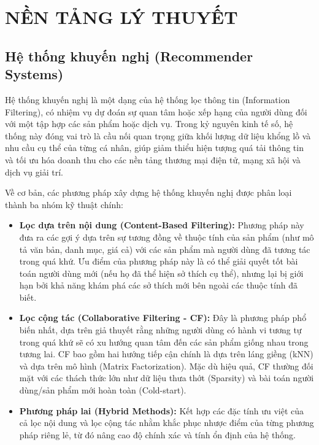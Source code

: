 \chapter{NỀN TẢNG LÝ THUYẾT}

\section{Hệ thống khuyến nghị (Recommender Systems)}

Hệ thống khuyến nghị là một dạng của hệ thống lọc thông tin (Information Filtering), có nhiệm vụ dự đoán sự quan tâm hoặc xếp hạng của người dùng đối với một tập hợp các sản phẩm hoặc dịch vụ. Trong kỷ nguyên kinh tế số, hệ thống này đóng vai trò là cầu nối quan trọng giữa khối lượng dữ liệu khổng lồ và nhu cầu cụ thể của từng cá nhân, giúp giảm thiểu hiện tượng quá tải thông tin và tối ưu hóa doanh thu cho các nền tảng thương mại điện tử, mạng xã hội và dịch vụ giải trí.

Về cơ bản, các phương pháp xây dựng hệ thống khuyến nghị được phân loại thành ba nhóm kỹ thuật chính:

\begin{itemize}
    \item \textbf{Lọc dựa trên nội dung (Content-Based Filtering):} Phương pháp này đưa ra các gợi ý dựa trên sự tương đồng về thuộc tính của sản phẩm (như mô tả văn bản, danh mục, giá cả) với các sản phẩm mà người dùng đã tương tác trong quá khứ. Ưu điểm của phương pháp này là có thể giải quyết tốt bài toán người dùng mới (nếu họ đã thể hiện sở thích cụ thể), nhưng lại bị giới hạn bởi khả năng khám phá các sở thích mới bên ngoài các thuộc tính đã biết.
    \item \textbf{Lọc cộng tác (Collaborative Filtering - CF):} Đây là phương pháp phổ biến nhất, dựa trên giả thuyết rằng những người dùng có hành vi tương tự trong quá khứ sẽ có xu hướng quan tâm đến các sản phẩm giống nhau trong tương lai. CF bao gồm hai hướng tiếp cận chính là dựa trên láng giềng (kNN) và dựa trên mô hình (Matrix Factorization). Mặc dù hiệu quả, CF thường đối mặt với các thách thức lớn như dữ liệu thưa thớt (Sparsity) và bài toán người dùng/sản phẩm mới hoàn toàn (Cold-start).
    \item \textbf{Phương pháp lai (Hybrid Methods):} Kết hợp các đặc tính ưu việt của cả lọc nội dung và lọc cộng tác nhằm khắc phục nhược điểm của từng phương pháp riêng lẻ, từ đó nâng cao độ chính xác và tính ổn định của hệ thống.
\end{itemize}


